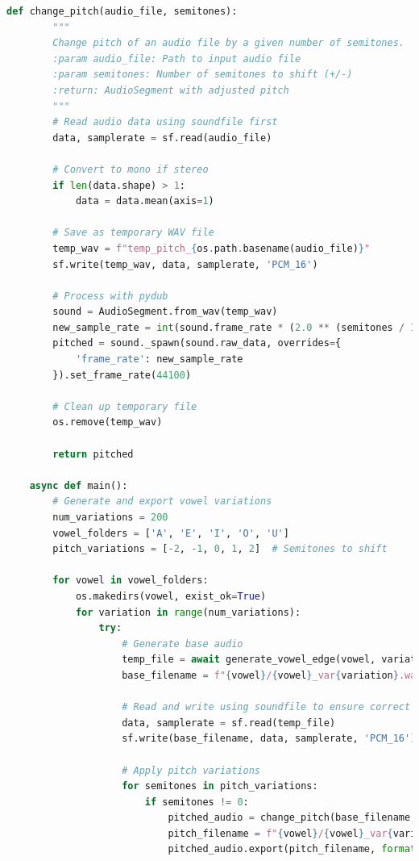 \begin{lstlisting}[language=Python, caption={Audio Generation with Edge TTS}]
    def change_pitch(audio_file, semitones):
        """
        Change pitch of an audio file by a given number of semitones.
        :param audio_file: Path to input audio file
        :param semitones: Number of semitones to shift (+/-)
        :return: AudioSegment with adjusted pitch
        """
        # Read audio data using soundfile first
        data, samplerate = sf.read(audio_file)
        
        # Convert to mono if stereo
        if len(data.shape) > 1:
            data = data.mean(axis=1)
        
        # Save as temporary WAV file
        temp_wav = f"temp_pitch_{os.path.basename(audio_file)}"
        sf.write(temp_wav, data, samplerate, 'PCM_16')
        
        # Process with pydub
        sound = AudioSegment.from_wav(temp_wav)
        new_sample_rate = int(sound.frame_rate * (2.0 ** (semitones / 12.0)))
        pitched = sound._spawn(sound.raw_data, overrides={
            'frame_rate': new_sample_rate
        }).set_frame_rate(44100)
        
        # Clean up temporary file
        os.remove(temp_wav)
        
        return pitched
    
    async def main():
        # Generate and export vowel variations
        num_variations = 200
        vowel_folders = ['A', 'E', 'I', 'O', 'U']
        pitch_variations = [-2, -1, 0, 1, 2]  # Semitones to shift
    
        for vowel in vowel_folders:
            os.makedirs(vowel, exist_ok=True)
            for variation in range(num_variations):
                try:
                    # Generate base audio
                    temp_file = await generate_vowel_edge(vowel, variation)
                    base_filename = f"{vowel}/{vowel}_var{variation}.wav"
                    
                    # Read and write using soundfile to ensure correct WAV format
                    data, samplerate = sf.read(temp_file)
                    sf.write(base_filename, data, samplerate, 'PCM_16')
                    
                    # Apply pitch variations
                    for semitones in pitch_variations:
                        if semitones != 0:
                            pitched_audio = change_pitch(base_filename, semitones)
                            pitch_filename = f"{vowel}/{vowel}_var{variation}_pitch{semitones}.wav"
                            pitched_audio.export(pitch_filename, format="wav")
                    

\end{lstlisting}
